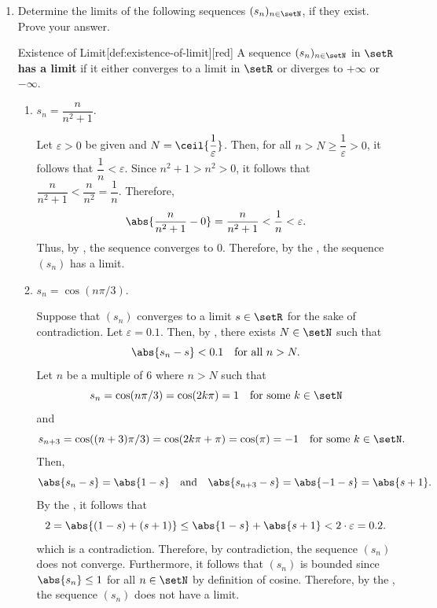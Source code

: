 \begin{enumerate}
  \item Determine the limits of the following sequences \((s_n)_{n\in\setN}\), if they exist. Prove your answer.
  \begin{define}
    {Existence of Limit}[def:existence-of-limit][red]
    A sequence \((s_n)_{n\in\setN}\) in \(\setR\) \textbf{has a limit} if it either converges to a limit in \(\setR\)
    or diverges to \(+\infty\) or \(-\infty\).
  \end{define}
  \begin{enumerate}
    \item \(s_n=\dfrac{n}{n^2+1}\).
    \begin{subprove}
      Let \(\varepsilon>0\) be given and 
      \(N=\ceil{\dfrac{1}{\varepsilon}}\).
      Then, for all \(n > N \ge \dfrac{1}{\varepsilon} > 0\), 
      it follows that \(\dfrac{1}{n} < \varepsilon\).
      Since \(n^2+1 > n^2 > 0\), it follows that \(\dfrac{n}{n^2+1} < \dfrac{n}{n^2} = \dfrac{1}{n}\).
      Therefore,
      \[
        \abs{\dfrac{n}{n^2+1} - 0} = \dfrac{n}{n^2+1} < \dfrac{1}{n} < \varepsilon.
      \]
      Thus, by , the sequence converges to \(0\).
      Therefore, by the , the sequence \((s_n)\) has a limit.
    \end{subprove}
    \item \(s_n=\cos(n\pi/3)\).
    \begin{subprove}
      Suppose that \((s_n)\) converges to a limit \(s \in \setR\) for the sake of contradiction.
      Let \(\varepsilon = 0.1\). Then,
      by , there exists \(N \in \setN\) such that
      \[
        \abs{s_n - s} < 0.1 \quad\text{for all } n > N.
      \]
      Let \(n\) be a multiple of 6 where \(n > N\) such that
      \[
        s_n = \cos(n\pi/3) = \cos(2k\pi) = 1 \quad\text{for some } k \in \setN
      \]
      and
      \[
        s_{n+3} = \cos((n+3)\pi/3) = \cos(2k\pi + \pi) = \cos(\pi) = -1 \quad\text{for some } k \in \setN.
      \]
      Then,
      \[
        \abs{s_n - s} = \abs{1 - s} \quad\text{and}\quad \abs{s_{n+3} - s} = \abs{-1-s} = \abs{s+1}.
      \]
      By the , it follows that
      \[
        2 = \abs{(1-s) + (s+1)} \leq \abs{1 - s} + \abs{s+1} < 2 \cdot \varepsilon = 0.2.
      \]
      which is a contradiction. Therefore, by contradiction, the sequence \((s_n)\) does not converge. 
      Furthermore, it follows that \((s_n)\) is bounded since \(\abs{s_n} \leq 1\) 
      for all \(n \in \setN\) by definition of cosine.
      Therefore, by the , the sequence \((s_n)\) does not have a limit.
    \end{subprove}
    \newpage


\end{enumerate}
\end{enumerate}
